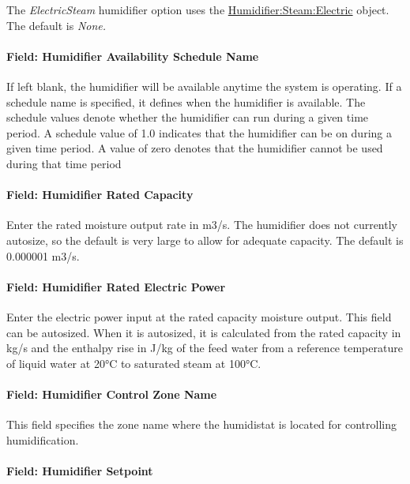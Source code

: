 The \emph{ElectricSteam} humidifier option uses the \hyperref[humidifiersteamelectric]{Humidifier:Steam:Electric} object. The default is \emph{None.}

\paragraph{Field: Humidifier Availability Schedule Name}\label{field-humidifier-availability-schedule-name-3}

If left blank, the humidifier will be available anytime the system is operating. If a schedule name is specified, it defines when the humidifier is available. The schedule values denote whether the humidifier can run during a given time period. A schedule value of 1.0 indicates that the humidifier can be on during a given time period. A value of zero denotes that the humidifier cannot be used during that time period

\paragraph{Field: Humidifier Rated Capacity}\label{field-humidifier-rated-capacity-3}

Enter the rated moisture output rate in m3/s. The humidifier does not currently autosize, so the default is very large to allow for adequate capacity. The default is 0.000001 m3/s.

\paragraph{Field: Humidifier Rated Electric Power}\label{field-humidifier-rated-electric-power-3}

Enter the electric power input at the rated capacity moisture output. This field can be autosized. When it is autosized, it is calculated from the rated capacity in kg/s and the enthalpy rise in J/kg of the feed water from a reference temperature of liquid water at 20°C to saturated steam at 100°C.

\paragraph{Field: Humidifier Control Zone Name}\label{field-humidifier-control-zone-name-3}

This field specifies the zone name where the humidistat is located for controlling humidification.

\paragraph{Field: Humidifier Setpoint}\label{field-humidifier-setpoint-2}

